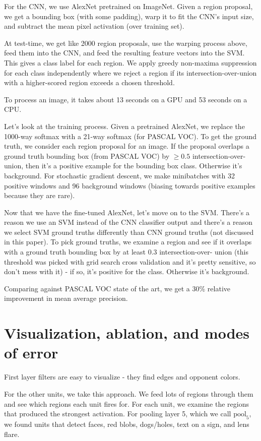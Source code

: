 \documentclass[a4paper]{article}
\begin{document}
For the CNN, we use AlexNet pretrained on ImageNet. Given a region proposal,
we get a bounding box (with some padding), warp it to fit the CNN's input size,
and subtract the mean pixel activation (over training set).

At test-time, we get like 2000 region proposals, use the warping process above,
feed them into the CNN, and feed the resulting feature vectors into the SVM.
This gives a class label for each region. We apply greedy non-maxima
suppression for each class independently where we reject a region if its
intersection-over-union with a higher-scored region exceeds a chosen threshold.

To process an image, it takes about 13 seconds on a GPU and 53 seconds on a CPU.

Let's look at the training process. Given a pretrained AlexNet, we replace the
1000-way softmax with a 21-way softmax (for PASCAL VOC). To get the ground
truth, we consider each region proposal for an image. If the proposal
overlaps a ground truth bounding box (from PASCAL VOC) by $\geq 0.5$
intersection-over-union, then it's a positive example for the bounding box
class. Otherwise it's background. For stochastic gradient descent, we make
minibatches with 32 positive windows and 96 background windows (biasing towards
positive examples because they are rare).

Now that we have the fine-tuned AlexNet, let's move on to the SVM. There's a
reason we use an SVM instead of the CNN classifier output and there's a reason
we select SVM ground truths differently than CNN ground truths (not discussed
in this paper). To pick ground truths, we examine a region and see if it
overlaps with a ground truth bounding box by at least 0.3 intersection-over-
union (this threshold was picked with grid search cross validation and it's
pretty sensitive, so don't mess with it) - if so, it's positive for the class.
Otherwise it's background.

Comparing against PASCAL VOC state of the art, we get a 30\% relative
improvement in mean average precision.

\section{Visualization, ablation, and modes of error}
First layer filters are easy to visualize - they find edges and opponent
colors.

For the other units, we take this approach. We feed lots of regions through
them and see which regions each unit fires for. For each unit, we examine
the regions that produced the strongest activation. For pooling layer 5,
which we call $\textrm{pool}_5$, we found units that detect faces, red blobs, dogs/holes,
text on a sign, and lens flare.
\end{document}
